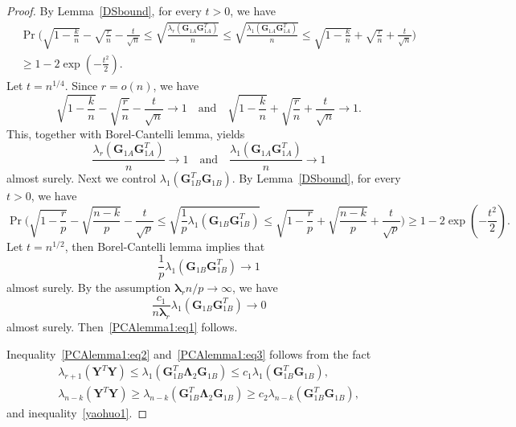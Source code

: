 \documentclass[12pt]{article} %
\newcommand{\bY}{\mathbf{Y}}
\newcommand{\bG}{\mathbf{G}}
\newcommand{\bfsym}[1]{\ensuremath{\boldsymbol{#1}}}
\def\blambda {\bfsym {\lambda}}
\def\bLambda {\bfsym {\Lambda}}
\theoremstyle{definition}
\begin{document}
\begin{appendices}
\begin{proof}
    By Lemma~\ref{DSbound}, for every $t>0$, we have
    \begin{equation}\label{yaohuo2}
    \begin{aligned}
        &\Pr\Big(\sqrt{1-\frac{k}{n}}-\sqrt{\frac{r}{n}}-\frac{t}{\sqrt{n}}\leq \sqrt{\frac{\lambda_r(\bG_{1A}\bG_{1A}^T)}{n}}\leq \sqrt{\frac{\lambda_1(\bG_{1A}\bG_{1A}^T)}{n}}\leq
        \sqrt{1-\frac{k}{n}}+\sqrt{\frac{r}{n}}+\frac{t}{\sqrt{n}} \Big) \\
        &\geq 1-2\exp(-\frac{t^2}{2}).
    \end{aligned}
    \end{equation}
    Let $t=n^{1/4}$. Since $r=o(n)$, we have
    $$
\sqrt{1-\frac{k}{n}}-\sqrt{\frac{r}{n}}-\frac{t}{\sqrt{n}}\to 1\quad\text{and}\quad
\sqrt{1-\frac{k}{n}}+\sqrt{\frac{r}{n}}+\frac{t}{\sqrt{n}}\to 1.
    $$
    This, together with Borel-Cantelli lemma, yields 
    $$
    \frac{\lambda_r(\bG_{1A}\bG_{1A}^T)}{n}\to 1\quad\text{and}\quad
    \frac{\lambda_1(\bG_{1A}\bG_{1A}^T)}{n}\to 1
    $$
    almost surely.
    Next we control $\lambda_1(\bG_{1B}^T \bG_{1B})$. By Lemma~\ref{DSbound}, for every $t>0$, we have
    \begin{equation}\label{yaohuo1}
        \Pr\Big(\sqrt{1-\frac{r}{p}}-\sqrt{\frac{n-k}{p}}-\frac{t}{\sqrt{p}} \leq \sqrt{\frac{1}{p}{\lambda_1(\bG_{1B}\bG_{1B}^T)} }\leq \sqrt{1-\frac{r}{p}}+\sqrt{\frac{n-k}{p}}+\frac{t}{\sqrt{p}} \Big) 
   \geq 1-2\exp(-\frac{t^2}{2}).
    \end{equation}
    Let $t=n^{1/2}$, then Borel-Cantelli lemma implies that 
    \begin{equation}\label{eq:qu1}
    \frac{1}{p}\lambda_1(\bG_{1B}\bG_{1B}^T)\to 1
    \end{equation}
    almost surely.
By the assumption $\blambda_r n/p\to \infty$, we have $$\frac{c_1}{n\blambda_r}{\lambda_1(\bG_{1B}\bG_{1B}^T)}\to 0$$
almost surely.
Then~\eqref{PCAlemma1:eq1} follows.

Inequality~\eqref{PCAlemma1:eq2} and~\eqref{PCAlemma1:eq3} follows from  the fact
\begin{align*}
\lambda_{r+1}(\bY^T \bY)\leq \lambda_1(\bG_{1B}^T \bLambda_2 \bG_{1B})\leq c_1 \lambda_1(\bG_{1B}^T \bG_{1B}),\\
    \lambda_{n-k}(\bY^T \bY)\geq \lambda_{n-k}(\bG_{1B}^T \bLambda_2 \bG_{1B})\geq c_2 \lambda_{n-k}(\bG_{1B}^T \bG_{1B}),
\end{align*}
and inequality~\eqref{yaohuo1}.
\end{proof}



\end{appendices}
\end{document}
